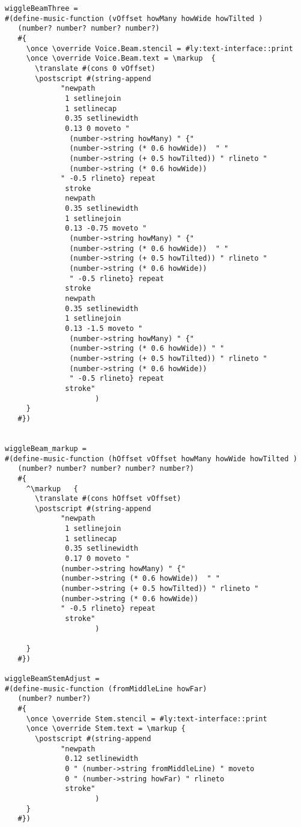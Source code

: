 \documentclass[11pt, oneside]{book}   	%
\begin{document}
\begin{verbatim}
wiggleBeamThree =
#(define-music-function (vOffset howMany howWide howTilted )
   (number? number? number? number?)
   #{
     \once \override Voice.Beam.stencil = #ly:text-interface::print
     \once \override Voice.Beam.text = \markup 	{
       \translate #(cons 0 vOffset)
       \postscript #(string-append
             "newpath 
              1 setlinejoin 
              1 setlinecap 
              0.35 setlinewidth 
              0.13 0 moveto "
               (number->string howMany) " {"
               (number->string (* 0.6 howWide))  " "
               (number->string (+ 0.5 howTilted)) " rlineto "
               (number->string (* 0.6 howWide))
             " -0.5 rlineto} repeat 
              stroke 
              newpath 
              0.35 setlinewidth 
              1 setlinejoin 
              0.13 -0.75 moveto "
               (number->string howMany) " {"
               (number->string (* 0.6 howWide))  " "
               (number->string (+ 0.5 howTilted)) " rlineto "
               (number->string (* 0.6 howWide))
               " -0.5 rlineto} repeat 
              stroke 
              newpath 
              0.35 setlinewidth 
              1 setlinejoin 
              0.13 -1.5 moveto "
               (number->string howMany) " {"
               (number->string (* 0.6 howWide)) " "
               (number->string (+ 0.5 howTilted)) " rlineto "
               (number->string (* 0.6 howWide))
               " -0.5 rlineto} repeat 
              stroke"
                     )
     }
   #})


wiggleBeam_markup =
#(define-music-function (hOffset vOffset howMany howWide howTilted )
   (number? number? number? number? number?)
   #{
     ^\markup 	{
       \translate #(cons hOffset vOffset)
       \postscript #(string-append
             "newpath 
              1 setlinejoin 
              1 setlinecap 
              0.35 setlinewidth 
              0.17 0 moveto "
             (number->string howMany) " {"
             (number->string (* 0.6 howWide))  " "
             (number->string (+ 0.5 howTilted)) " rlineto "
             (number->string (* 0.6 howWide))
             " -0.5 rlineto} repeat 
              stroke"
                     )

     }
   #})

wiggleBeamStemAdjust =
#(define-music-function (fromMiddleLine howFar)
   (number? number?)
   #{
     \once \override Stem.stencil = #ly:text-interface::print
     \once \override Stem.text = \markup {
       \postscript #(string-append
             "newpath 
              0.12 setlinewidth 
              0 " (number->string fromMiddleLine) " moveto 
              0 " (number->string howFar) " rlineto 
              stroke"
                     )
     }
   #})
   

\end{verbatim}
\end{document}
